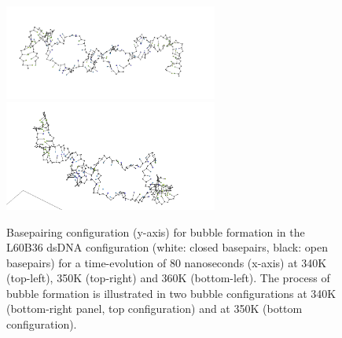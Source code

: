 \begin{figure}[h] \begin{minipage}{7cm}
 \end{minipage} \begin{minipage}{7cm}  \end{minipage}
\begin{minipage}{8cm}
 \end{minipage} \begin{minipage}{6cm}
\includegraphics[width=7cm]{images/L60B36_bubble2.png}\\
\includegraphics[width=7cm]{images/L60B36_bubble1.png} \end{minipage}
\begin{center}
\caption{Basepairing configuration (y-axis) for bubble formation in the L60B36 dsDNA configuration (white: closed basepairs, black: open basepairs) for a time-evolution of 80 nanoseconds (x-axis) at 340K (top-left), 350K (top-right) and 360K (bottom-left). The process of bubble formation is illustrated in two bubble configurations at 340K (bottom-right panel, top configuration) and at 350K (bottom configuration). }\label{L60B36_configs}
\end{center}
\end{figure}





